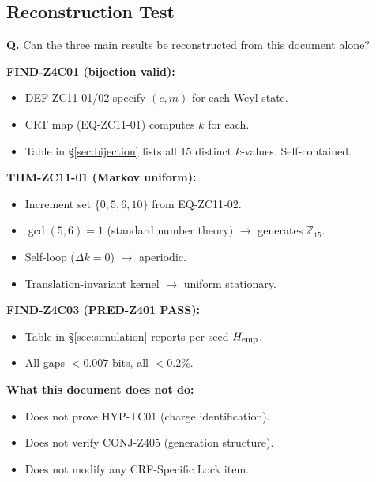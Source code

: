 \documentclass[12pt, a4paper]{article}
\begin{document}
\subsection{Reconstruction Test}
\label{sec:reconstruction}

\begin{formalbox}[title={Reconstruction Test (CUIP No-Loss)}]
\textbf{Q.} Can the three main results be reconstructed from this
document alone?

\textbf{FIND-Z4C01 (bijection valid):}
\begin{itemize}[leftmargin=*, noitemsep]
  \item DEF-ZC11-01/02 specify $(c,m)$ for each Weyl state.
  \item CRT map (EQ-ZC11-01) computes $k$ for each.
  \item Table in \S\ref{sec:bijection} lists all 15 distinct $k$-values.
  Self-contained. \checkmark
\end{itemize}

\textbf{THM-ZC11-01 (Markov uniform):}
\begin{itemize}[leftmargin=*, noitemsep]
  \item Increment set $\{0,5,6,10\}$ from EQ-ZC11-02.
  \item $\gcd(5,6)=1$ (standard number theory) $\to$ generates $\mathbb{Z}_{15}$.
  \item Self-loop ($\Delta k = 0$) $\to$ aperiodic.
  \item Translation-invariant kernel $\to$ uniform stationary. \checkmark
\end{itemize}

\textbf{FIND-Z4C03 (PRED-Z401 PASS):}
\begin{itemize}[leftmargin=*, noitemsep]
  \item Table in \S\ref{sec:simulation} reports per-seed $H_{\rm emp}$.
  \item All gaps $< 0.007$ bits, all $< 0.2\%$. \checkmark
\end{itemize}

\textbf{What this document does not do:}
\begin{itemize}[leftmargin=*, noitemsep]
  \item Does not prove HYP-TC01 (charge identification).
  \item Does not verify CONJ-Z405 (generation structure).
  \item Does not modify any CRF-Specific Lock item.
\end{itemize}
\end{formalbox}
\end{document}
